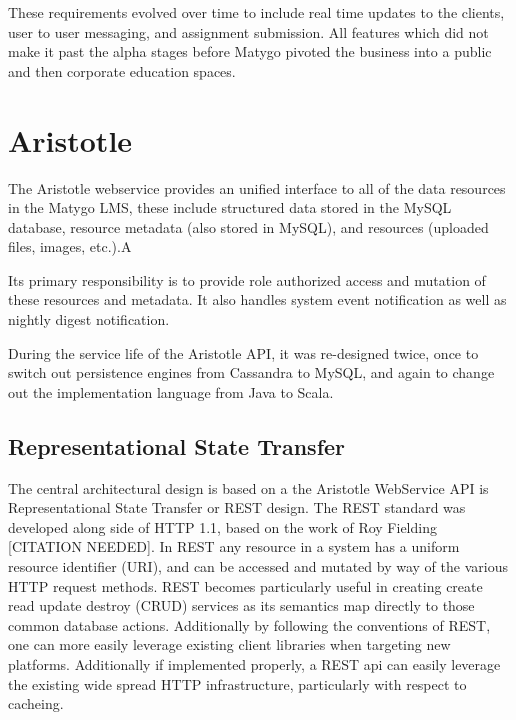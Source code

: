 \documentclass[a4paper,12pt,titlepage]{report}
\begin{document}
These requirements evolved over time to include real time updates to the clients, user to user messaging, and assignment submission. All features which did not make it past the alpha stages before Matygo pivoted the business into a public and then corporate education spaces. 



\section{Aristotle} %
\label{sec:aristotle}

The Aristotle webservice provides an unified interface to all of the data resources in the Matygo LMS, these include structured data stored in the MySQL database, resource metadata (also stored in MySQL), and resources (uploaded files, images, etc.).A

Its primary responsibility is to provide role authorized access and mutation of these resources and metadata. It also handles system event notification as well as nightly digest notification.

During the service life of the Aristotle API, it was re-designed twice, once to switch out persistence engines from Cassandra to MySQL, and again to change out the implementation language from Java to Scala.

\subsection{Representational State Transfer} %
\label{sub:rest_webservices}

The central architectural design is based on a the Aristotle WebService API is Representational State Transfer or REST design. The REST standard was developed along side of HTTP 1.1, based on the work of Roy Fielding [CITATION NEEDED].
In REST any resource in a system has a uniform resource identifier (URI), and can be accessed and mutated by way of the various HTTP request methods. 
REST becomes particularly useful in creating create read update destroy (CRUD) services as its semantics map directly to those common database actions. 
Additionally by following the conventions of REST, one can more easily leverage existing client libraries when targeting new platforms. Additionally if implemented properly, a REST api can easily leverage the existing wide spread HTTP infrastructure, particularly with respect to cacheing.
\end{document}
